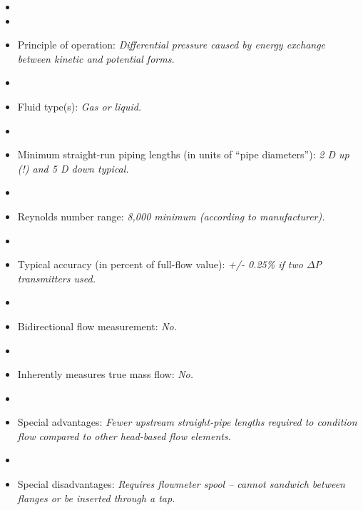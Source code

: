 \begin{itemize}
\goodbreak
\item{} 
\vskip 5pt
\item\item{} Principle of operation: {\it Differential pressure caused by energy exchange between kinetic and potential forms.}
\vskip 5pt
\item\item{} Fluid type(s): {\it Gas or liquid.}
\vskip 5pt
\item\item{} Minimum straight-run piping lengths (in units of ``pipe diameters''): {\it 2 D up (!) and 5 D down typical.}
\vskip 5pt
\item\item{} Reynolds number range: {\it 8,000 minimum (according to manufacturer).}
\vskip 5pt
\item\item{} Typical accuracy (in percent of full-flow value): {\it +/- 0.25\% if two $\Delta$P transmitters used.}
\vskip 5pt
\item\item{} Bidirectional flow measurement: {\it No.}
\vskip 5pt
\item\item{} Inherently measures true mass flow: {\it No.}
\vskip 5pt
\item\item{} Special advantages: {\it Fewer upstream straight-pipe lengths required to condition flow compared to other head-based flow elements.}
\vskip 5pt
\item\item{} Special disadvantages: {\it Requires flowmeter spool -- cannot sandwich between flanges or be inserted through a tap.}
\end{itemize}

